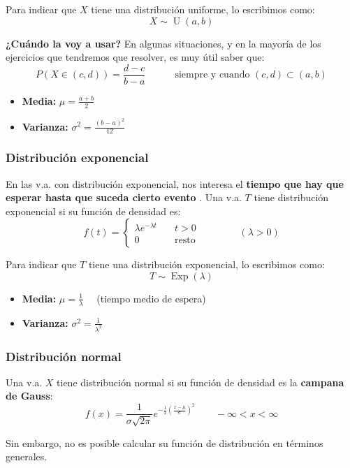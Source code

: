 \documentclass[a4paper]{book}
\numberwithin{figure}{section}
\numberwithin{equation}{subsection}
\numberwithin{figure}{chapter}
\theoremstyle{definition}
\DeclareMathOperator{\U}{U}
\DeclareMathOperator{\Exp}{Exp}
\begin{document}
Para indicar que $X$ tiene una distribución uniforme, lo escribimos como: \[X\sim \U(a,b)\]

\textbf{¿Cuándo la voy a usar?} En algunas situaciones, y en la mayoría de los ejercicios que tendremos que resolver, es muy útil saber que: \[P\left( X \in (c,d) \right)= \frac{d-c}{b-a} \qquad \quad \text{siempre y cuando }(c,d)\subset (a,b)\]

\begin{itemize}
	\item \textbf{Media:} $\displaystyle{\mu = \frac{a+b}{2}}$
	\item \textbf{Varianza:} $\displaystyle{\sigma ^2 = \frac{\left( b-a \right)^2}{12}}$
\end{itemize}

\subsubsection{Distribución exponencial}
En las v.a. con distribución exponencial, nos interesa el \textbf{tiempo que hay que esperar hasta que suceda cierto evento }. Una v.a. $T$ tiene distribución exponencial si su función de densidad es: \[f(t) = \left\{ \begin{matrix}
		\lambda e^{-\lambda t} & \quad t>0           \\[5pt]
		0                      & \quad  \text{resto}
	\end{matrix} \right.\qquad\qquad  \left( \lambda >0 \right)\]

Para indicar que $T$ tiene una distribución exponencial, lo escribimos como: \[T\sim \Exp(\lambda )\]

\begin{itemize}
	\item \textbf{Media:} $\displaystyle{\mu = \frac{1}{\lambda}}\quad $ (tiempo medio de espera)
	\item \textbf{Varianza:} $\displaystyle{\sigma ^2 = \frac{1}{\lambda ^2}}$
\end{itemize}

\subsubsection{Distribución normal}
Una v.a. $X$ tiene distribución normal si su función de densidad es la \textbf{campana de Gauss}: \[f(x) = \frac{1}{\sigma \sqrt{2\pi}}e^{-\frac{1}{2}\left( \frac{x-\mu }{\sigma} \right)^2} \qquad -\infty <x< \infty \]

Sin embargo, no es posible calcular su función de distribución en términos generales.
\end{document}
